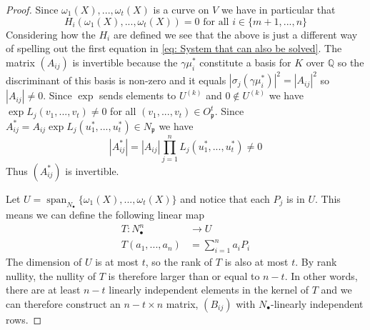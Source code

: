 \documentclass{article}
\newcommand{\Span}{\operatorname{span}}
\newcommand{\mfrak}[1]{\mathfrak{#1}}
\newcommand{\mbb}[1]{\mathbb{#1}}
\begin{document}
\begin{proof}
    Since $\omega_1(X), ..., \omega_t(X)$ is a curve on $V$ we have in particular that
\begin{equation}\label{eq: Last reformulation of initial equations}
    H_i(\omega_1(X), ..., \omega_t(X)) = 0 \text{ for all } i \in \{m+1, ..., n\}
\end{equation}
Considering how the $H_i$ are defined we see that the above is just a different way of spelling out the first equation in \cref{eq: System that can also be solved}. The matrix $(A_{ij})$ is invertible because the $\gamma \mu_i^*$ constitute a basis for $K$ over $\mbb{Q}$ so the discriminant of this basis is non-zero and it equals $|\sigma_j(\gamma \mu_i^*)|^2 = |A_{ij}|^2$ so $|A_{ij}| \neq 0$. Since $\exp$ sends elements to $U^{(k)}$ and $0 \notin U^{(k)}$ we have $\exp L_j(v_1, ..., v_t) \neq 0$ for all $(v_1, ..., v_t) \in O_\mfrak p^t$. Since $A_{ij}^* = A_{ij} \exp L_j(u_1^*, ..., u_t^*) \in N_\mfrak p$ we have
$$|A_{ij}^*| = |A_{ij}| \prod_{j = 1}^n L_j(u_1^*, ..., u_t^*) \neq 0$$  
Thus $(A_{ij}^*)$ is invertible. 


Let $U = \Span_{N_\bullet} \{ \omega_1(X), ..., \omega_t(X) \}$ and notice that each $P_j$ is in $U$. This means we can define the following linear map
\begin{align*}
    T : N_\bullet^n &\to U \\
    T(a_1, ..., a_n) &= \sum_{i = 1}^n a_i P_i
\end{align*}
The dimension of $U$ is at most $t$, so the rank of $T$ is also at most $t$. By rank nullity, the nullity of $T$ is therefore larger than or equal to $n-t$. In other words, there are at least $n-t$ linearly independent elements in the kernel of $T$ and we can therefore construct an $n-t \times n$ matrix, $(B_{ij})$ with $N_\bullet$-linearly independent rows. 
\end{proof}
\end{document}
